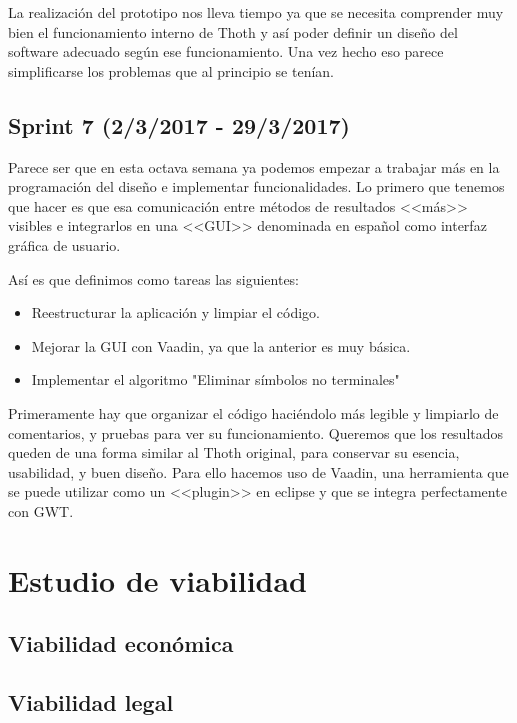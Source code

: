 La realización del prototipo nos lleva tiempo ya que se necesita comprender muy bien el funcionamiento interno de Thoth y así poder definir un diseño del software adecuado según ese funcionamiento. Una vez hecho eso parece simplificarse los problemas que al principio se tenían.

\subsection{Sprint 7 (2/3/2017 - 29/3/2017)}

Parece ser que en esta octava semana ya podemos empezar a trabajar más en la programación del diseño e implementar funcionalidades. Lo primero que tenemos que hacer es que esa comunicación entre métodos de resultados <<más>> visibles e integrarlos en una <<GUI>> denominada en español como interfaz gráfica de usuario. 

Así es que definimos como tareas las siguientes:

\begin{itemize}
\item Reestructurar la aplicación y limpiar el código.
\item Mejorar la GUI con Vaadin, ya que la anterior es muy básica.
\item Implementar el algoritmo "Eliminar símbolos no terminales"
\end{itemize}

Primeramente hay que organizar el código haciéndolo más legible y limpiarlo de comentarios, y pruebas para ver su funcionamiento. Queremos que los resultados queden de una forma similar al Thoth original, para conservar su esencia, usabilidad, y buen diseño. Para ello hacemos uso de Vaadin, una herramienta que se puede utilizar como un <<plugin>> en eclipse y que se integra perfectamente con GWT.

\section{Estudio de viabilidad}

\subsection{Viabilidad económica}

\subsection{Viabilidad legal}


